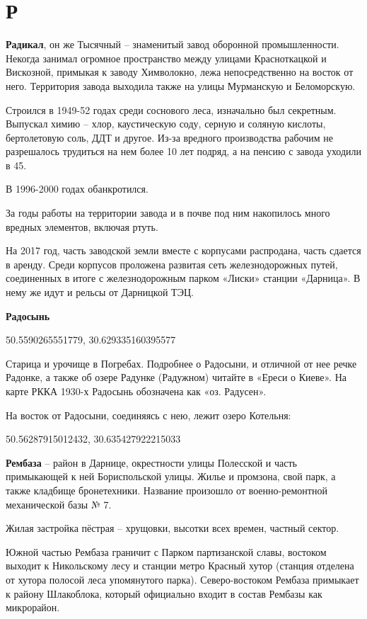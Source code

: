 \chapter*{Р}

\textbf{Радикал}, он же Тысячный – знаменитый завод оборонной промышленности. Некогда занимал огромное пространство между улицами Красноткацкой и Вискозной, примыкая к заводу Химволокно, лежа непосредственно на восток от него. Территория завода выходила также на улицы Мурманскую и Беломорскую.

Строился в 1949-52 годах среди соснового леса, изначально был секретным. Выпускал химию –  хлор, каустическую соду, серную и соляную кислоты, бертолетовую соль, ДДТ и другое. Из-за вредного производства рабочим не разрешалось трудиться на нем более 10 лет подряд, а на пенсию с завода уходили в 45.

В 1996-2000 годах обанкротился.

За годы работы на территории завода и в почве под ним накопилось много вредных элементов, включая ртуть.

На 2017 год, часть заводской земли вместе с корпусами распродана, часть сдается в аренду. Среди корпусов проложена развитая сеть железнодорожных путей, соединенных в итоге с железнодорожным парком «Лиски» станции «Дарница». В нему же идут и рельсы от Дарницкой ТЭЦ.\\

\medskip

\textbf{Радосынь} 

50.5590265551779, 30.629335160395577

Старица и урочище в Погребах. Подробнее о Радосыни, и отличной от нее речке Радонке, а также об озере Радунке (Радужном) читайте в «Ереси о Киеве». На карте РККА 1930-х Радосынь обозначена как «оз. Радусен». 

На восток от Радосыни, соединяясь с нею, лежит озеро Котельня:

50.56287915012432, 30.635427922215033\\

\medskip

\textbf{Рембаза} – район в Дарнице, окрестности улицы Полесской и часть примыкающей к ней Бориспольской улицы. Жилье и промзона, свой парк, а также кладбище бронетехники. Название произошло от военно-ремонтной механической базы № 7.

Жилая застройка пёстрая – хрущовки, высотки всех времен, частный сектор.

Южной частью Рембаза граничит с Парком партизанской славы, востоком выходит к Никольскому лесу и станции метро Красный хутор (станция отделена от хутора полосой леса упомянутого парка). Северо-востоком Рембаза примыкает к району Шлакоблока, который официально входит в состав Рембазы как микрорайон.\\

